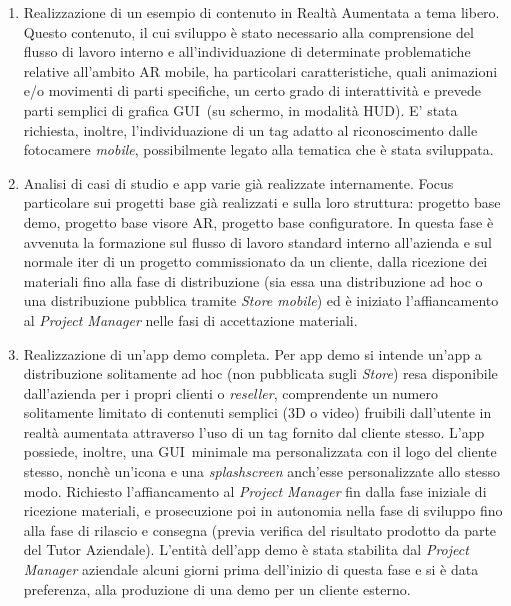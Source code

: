 \begin{enumerate}
	\item	Realizzazione di un esempio di contenuto in Realtà Aumentata a tema libero. Questo contenuto, il cui sviluppo è stato necessario alla comprensione del flusso di lavoro interno e all'individuazione di determinate problematiche relative all’ambito AR mobile, ha particolari caratteristiche, quali animazioni e/o movimenti di parti specifiche, un certo grado di interattività e prevede parti semplici di grafica GUI\gloss\ (su schermo, in modalità HUD). E' stata richiesta, inoltre, l’individuazione di un tag adatto al riconoscimento dalle fotocamere \textit{mobile}, possibilmente legato alla tematica che \`e stata sviluppata.
	\item	Analisi di casi di studio e app varie già realizzate internamente. Focus particolare sui progetti base già realizzati e sulla loro struttura: progetto base demo, progetto base visore AR, progetto base configuratore. In questa fase \`e avvenuta la formazione sul flusso di lavoro standard interno all’azienda e sul normale iter di un progetto commissionato da un cliente, dalla ricezione dei materiali fino alla fase di distribuzione (sia essa una distribuzione ad hoc o una distribuzione pubblica tramite \textit{Store mobile}) ed \`e iniziato l'affiancamento al \textit{Project Manager} nelle fasi di accettazione materiali. 
	\item	Realizzazione di un’app demo completa. Per app demo si intende un’app a distribuzione solitamente ad hoc (non pubblicata sugli \textit{Store}) resa disponibile dall’azienda per i propri clienti o \textit{reseller}, comprendente un numero solitamente limitato di contenuti semplici (3D o video) fruibili dall’utente in realtà aumentata attraverso l’uso di un tag fornito dal cliente stesso. L’app possiede, inoltre, una GUI\gloss\ minimale ma personalizzata con il logo del cliente stesso, nonchè un’icona e una \textit{splashscreen} anch’esse personalizzate allo stesso modo. Richiesto l'affiancamento al \textit{Project Manager} fin dalla fase iniziale di ricezione materiali, e prosecuzione poi in autonomia nella fase di sviluppo fino alla fase di rilascio e consegna (previa verifica del risultato prodotto da parte del Tutor Aziendale). L’entità dell’app demo \`e stata stabilita dal \textit{Project Manager} aziendale alcuni giorni prima dell’inizio di questa fase e si \`e data preferenza, alla produzione di una demo per un cliente esterno. 

\end{enumerate}
